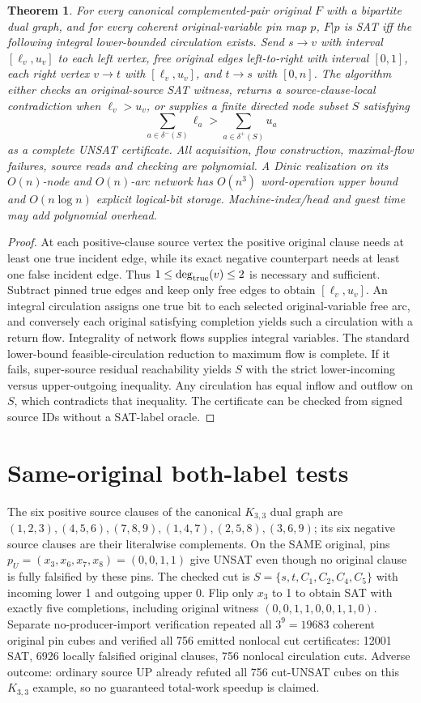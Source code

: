 \documentclass[11pt]{article}
\newtheorem{theorem}{Theorem}
\begin{document}
\begin{theorem}
For every canonical complemented-pair original $F$ with a bipartite dual graph, and for every coherent original-variable pin map $p$, $F|p$ is SAT iff the following integral lower-bounded circulation exists. Send $s\to v$ with interval $[\ell_v,u_v]$ to each left vertex, free original edges left-to-right with interval $[0,1]$, each right vertex $v\to t$ with $[\ell_v,u_v]$, and $t\to s$ with $[0,n]$. The algorithm either checks an original-source SAT witness, returns a source-clause-local contradiction when $\ell_v>u_v$, or supplies a finite directed node subset $S$ satisfying
\[
 \sum_{a\in\delta^-(S)}\ell_a>
 \sum_{a\in\delta^+(S)}u_a
\]
as a complete UNSAT certificate. All acquisition, flow construction, maximal-flow failures, source reads and checking are polynomial. A Dinic realization on its $O(n)$-node and $O(n)$-arc network has $O(n^3)$ word-operation upper bound and $O(n\log n)$ explicit logical-bit storage. Machine-index/head and guest time may add polynomial overhead.
\end{theorem}
\begin{proof}
At each positive-clause source vertex the positive original clause needs at least one true incident edge, while its exact negative counterpart needs at least one false incident edge. Thus $1\le\deg_{\rm true}(v)\le 2$ is necessary and sufficient. Subtract pinned true edges and keep only free edges to obtain $[\ell_v,u_v]$. An integral circulation assigns one true bit to each selected original-variable free arc, and conversely each original satisfying completion yields such a circulation with a return flow. Integrality of network flows supplies integral variables. The standard lower-bound feasible-circulation reduction to maximum flow is complete. If it fails, super-source residual reachability yields $S$ with the strict lower-incoming versus upper-outgoing inequality. Any circulation has equal inflow and outflow on $S$, which contradicts that inequality. The certificate can be checked from signed source IDs without a SAT-label oracle.
\end{proof}

\section*{Same-original both-label tests}
The six positive source clauses of the canonical $K_{3,3}$ dual graph are
$(1,2,3),(4,5,6),(7,8,9),(1,4,7),(2,5,8),(3,6,9)$; its six negative source clauses are their literalwise complements. On the SAME original, pins $p_U=(x_3,x_6,x_7,x_8)=(0,0,1,1)$ give UNSAT even though no original clause is fully falsified by these pins. The checked cut is $S=\{s,t,C_1,C_2,C_4,C_5\}$ with incoming lower 1 and outgoing upper 0. Flip only $x_3$ to 1 to obtain SAT with exactly five completions, including original witness $(0,0,1,1,0,0,1,1,0)$. Separate no-producer-import verification repeated all $3^9=19683$ coherent original pin cubes and verified all 756 emitted nonlocal cut certificates: 12001 SAT, 6926 locally falsified original clauses, 756 nonlocal circulation cuts. Adverse outcome: ordinary source UP already refuted all 756 cut-UNSAT cubes on this $K_{3,3}$ example, so no guaranteed total-work speedup is claimed.
\end{document}
